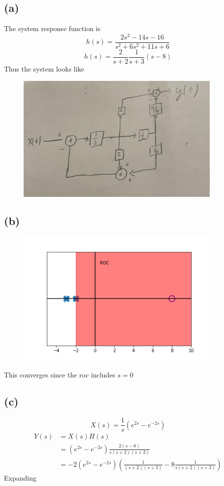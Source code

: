 \documentclass[12pt]{article}
\begin{document}
\subsection*{(a)}
The system response function is
$$h(s)=\frac{2s^2-14s-16}{s^2+6s^2+11s+6}$$
$$h(s)=\frac{2}{s+2}\frac{1}{s+3}(s-8)$$
Thus the system looks like
\begin{center}
\begin{figure}[h]\includegraphics[width=10cm]{fig1}
\end{figure}
\end{center}
\subsection*{(b)}
\begin{center}
\begin{figure}[h]\includegraphics[width=10cm]{fig2}
\end{figure}
\end{center}
This converges since the roc includes $s=0$
\subsection*{(c)}
$$X(s)=\frac{1}{s}\left(e^{2s}-e^{-2s}\right)$$
\begin{align*}
Y(s)&=X(s)H(s)\\
&=\left(e^{2s}-e^{-2s}\right)\frac{2(s-8)}{s(s+2)(s+3)}\\
&=-2\left(e^{2s}-e^{-2s}\right)\left(\frac{1}{(s+2)(s+3)}-8\frac{1}{s(s+2)(s+3)}\right)
\end{align*}
Expanding
\end{document}
